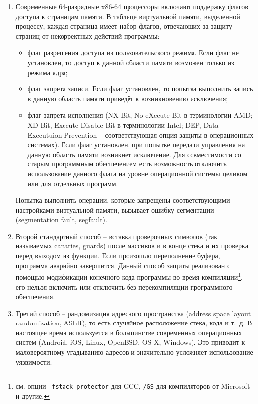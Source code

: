 \begin{enumerate}
	\item Современные 64-разрядные x86-64 процессоры включают поддержку флагов доступа к страницам памяти. В таблице виртуальной памяти, выделенной процессу, каждая страница имеет набор флагов, отвечающих за защиту страниц от некорректных действий программы:
	\begin{itemize}
		\item флаг разрешения доступа из пользовательского режима. Если флаг не установлен, то доступ к данной области памяти возможен только из режима ядра;
		\item флаг запрета записи. Если флаг установлен, то попытка выполнить запись в данную область памяти приведёт к возникновению исключения;
		\item флаг запрета исполнения (NX-Bit, No eXecute Bit в терминологии AMD; XD-Bit, Execute Disable Bit в терминологии Intel; DEP, Data Executuion Prevention -- соответствующая опция защиты в операционных системах). Если флаг установлен, при попытке передачи управления на данную область памяти возникнет исключение. Для совместимости со старым программным обеспечением есть возможность отключить использование данного флага на уровне операционной системы целиком или для отдельных программ.
	\end{itemize}
	Попытка выполнить операции, которые запрещены соответствующими настройками виртуальной памяти, вызывает ошибку сегментации (segmentation fault, segfault).

    \item Второй стандартный способ -- вставка проверочных символов (так называемых canaries, guards) после массивов и в конце стека и их проверка перед выходом из функции. Если произошло переполнение буфера, программа аварийно завершится. Данный способ защиты реализован с помощью модификации конечного кода программы во время компиляции\footnote{см. опции \texttt{-fstack-protector} для GCC, \texttt{/GS} для компиляторов от Microsoft и другие.}, его нельзя включить или отключить без перекомпиляции программного обеспечения.

    \item Третий способ -- рандомизация адресного пространства (address space layout randomization, ASLR), то есть случайное расположение стека, кода и т.~д. В настоящее время используется в большинстве современных операционных систем (Android, iOS, Linux, OpenBSD, OS X, Windows). Это приводит к маловероятному угадыванию адресов и значительно усложняет использование уязвимости.
\end{enumerate}


